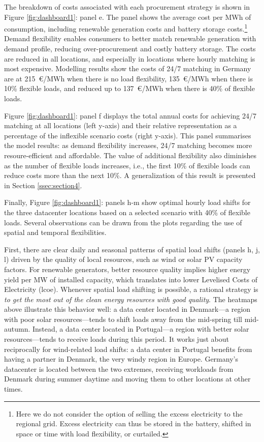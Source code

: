 The breakdown of costs associated with each procurement strategy is shown in Figure \ref{fig:dashboard1}: panel e. The panel shows the average cost per MWh of consumption, including renewable generation costs and battery storage costs.\footnote{Here we do not consider the option of selling the excess electricity to the regional grid. Excess electricity can thus be stored in the battery, shifted in space or time with load flexibility, or curtailed.} Demand flexibility enables consumers to better match renewable generation with demand profile, reducing over-procurement and costly battery storage. The costs are reduced in all locations, and especially in locations where hourly matching is most expensive. Modelling results show the costs of 24/7 matching in Germany are at 215~\euro/MWh when there is no load flexibility, 135~\euro/MWh when there is 10\% flexible loads, and reduced up to 137~\euro/MWh when there is 40\% of flexible loads.

Figure \ref{fig:dashboard1}: panel f displays the total annual costs for achieving 24/7 matching at all locations (left y-axis) and their relative representation as a percentage of the inflexible scenario costs (right y-axis). This panel summarises the model results: as demand flexibility increases, 24/7 matching becomes more resoure-efficient and affordable. The value of additional flexibility also diminishes as the number of flexible loads increases, i.e., the first 10\% of flexible loads can reduce costs more than the next 10\%. A generalization of this result is presented in Section \ref{ssec:section4}.

Finally, Figure \ref{fig:dashboard1}: panels h-m show optimal hourly load shifts for the three datacenter locations based on a selected scenario with 40\% of flexible loads. Several observations can be drawn from the plots regarding the use of spatial and temporal flexibilities.

First, there are clear daily and seasonal patterns of spatial load shifts (panels h, j, l) driven by the quality of local resources, such as wind or solar PV capacity factors. For renewable generators, better resource quality implies higher energy yield per MW of installed capacity, which translates into lower Levelised Costs of Electricity (\gls{lcoe}). Whenever spatial load shifting is possible, a rational strategy is \textit{to get the most out of the clean energy resources with good quality}. The heatmaps above illustrate this behavior well: a data center located in Denmark---a region with poor solar resources---tends to shift loads away from the mid-spring till mid-autumn. Instead, a data center located in Portugal---a region with better solar resources---tends to receive loads during this period. It works just about reciprocally for wind-related load shifts: a data center in Portugal benefits from having a partner in Denmark, the very windy region in Europe.
Germany's datacenter is located between the two extremes, receiving workloads from Denmark during summer daytime and moving them to other locations at other times.


